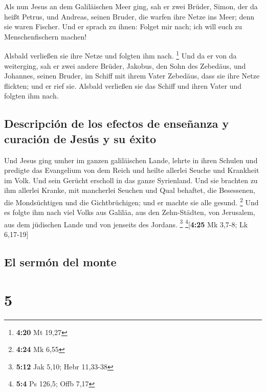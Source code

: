  Als nun Jesus an dem Galiläischen Meer ging, sah er zwei
Brüder, Simon, der da heißt Petrus, und Andreas, seinen Bruder, die
warfen ihre Netze ins Meer; denn sie waren Fischer.  Und
er sprach zu ihnen: Folget mir nach; ich will euch zu Menschenfischern
machen!

 Alsbald verließen sie ihre Netze und folgten ihm nach.
\footnote{\textbf{4:20} Mt 19,27}  Und da er von da
weiterging, sah er zwei andere Brüder, Jakobus, den Sohn des Zebedäus,
und Johannes, seinen Bruder, im Schiff mit ihrem Vater Zebedäus, dass
sie ihre Netze flickten; und er rief sie.  Alsbald
verließen sie das Schiff und ihren Vater und folgten ihm nach.

\hypertarget{descripciuxf3n-de-los-efectos-de-enseuxf1anza-y-curaciuxf3n-de-jesuxfas-y-su-uxe9xito}{%
\subsection{Descripción de los efectos de enseñanza y curación de Jesús
y su
éxito}\label{descripciuxf3n-de-los-efectos-de-enseuxf1anza-y-curaciuxf3n-de-jesuxfas-y-su-uxe9xito}}

 Und Jesus ging umher im ganzen galiläischen Lande,
lehrte in ihren Schulen und predigte das Evangelium von dem Reich und
heilte allerlei Seuche und Krankheit im Volk.  Und sein
Gerücht erscholl in das ganze Syrienland. Und sie brachten zu ihm
allerlei Kranke, mit mancherlei Seuchen und Qual behaftet, die
Besessenen, die Mondsüchtigen und die Gichtbrüchigen; und er machte sie
alle gesund. \footnote{\textbf{4:24} Mk 6,55}  Und es
folgte ihm nach viel Volks aus Galiläa, aus den Zehn-Städten, von
Jerusalem, aus dem jüdischen Lande und von jenseits des Jordans.
\footnote{\textbf{5:12} Jak 5,10; Hebr 11,33-38}
\footnote{\textbf{5:4} Ps 126,5; Offb 7,17}{[}\textbf{4:25} Mk 3,7-8; Lk
6,17-19{]}

\hypertarget{el-sermuxf3n-del-monte}{%
\subsection{El sermón del monte}\label{el-sermuxf3n-del-monte}}

\hypertarget{section-4}{%
\section{5}\label{section-4}}


